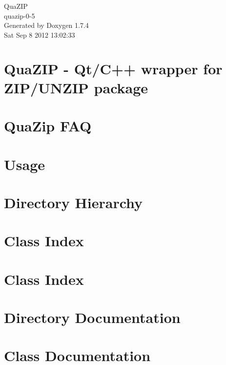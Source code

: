 \documentclass[a4paper]{book}
\begin{document}
\begin{titlepage}
\vspace*{7cm}
\begin{center}
{\Large QuaZIP \\[1ex]\large quazip-\/0-\/5 }\\
\vspace*{1cm}
{\large Generated by Doxygen 1.7.4}\\
\vspace*{0.5cm}
{\small Sat Sep 8 2012 13:02:33}\\
\end{center}
\end{titlepage}
\clearemptydoublepage
{}
\tableofcontents
\clearemptydoublepage
{}
\chapter{QuaZIP -\/ Qt/C++ wrapper for ZIP/UNZIP package}
\label{index}
\chapter{QuaZip FAQ}
\label{faq}

\chapter{Usage}
\label{usage}

\chapter{Directory Hierarchy}

\chapter{Class Index}

\chapter{Class Index}

\chapter{Directory Documentation}

\chapter{Class Documentation}


















\printindex
\end{document}
